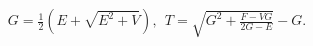 \documentclass[10pt]{article}
\begin{document}
\begin{align*}G = \frac{1}{2} \left( E + \sqrt{ E^2 + V }\right), 
\ \
T = \sqrt{ G^2 + \frac{ F - V G }{ 2 G - E } } - G .\end{align*}
\end{document}
